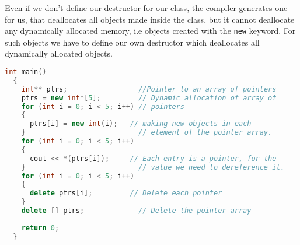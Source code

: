 \documentclass[11pt,fleqn]{book} %
\begin{document}

Even if we don't define our destructor for our class, the compiler generates one for us, that deallocates all objects made inside the class, but it cannot deallocate any dynamically allocated memory, i.e objects created with the \texttt{new} keyword. For such objects we have to define our own destructor which deallocates all dynamically allocated objects.




\begin{lstlisting}[language=C++, caption={Use of Array of Pointers and Destructors}]
  int main()
  {
    int** ptrs;                 //Pointer to an array of pointers
    ptrs = new int*[5];         // Dynamic allocation of array of 
    for (int i = 0; i < 5; i++) // pointers
    {
      ptrs[i] = new int(i);   // making new objects in each 
    }                           // element of the pointer array.
    for (int i = 0; i < 5; i++)
    {
      cout << *(ptrs[i]);     // Each entry is a pointer, for the
    }                           // value we need to dereference it.
    for (int i = 0; i < 5; i++)
    {
      delete ptrs[i];         // Delete each pointer
    }  
    delete [] ptrs;             // Delete the pointer array
    
    return 0;
  }
\end{lstlisting}
\end{document}
